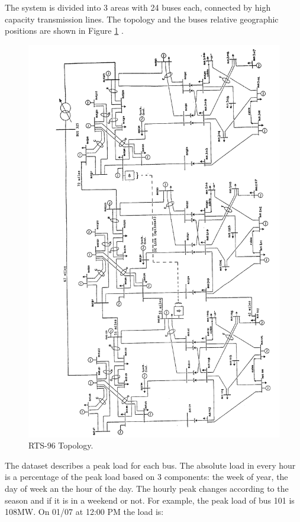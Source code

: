 \documentclass[12pt,LUDisStyle,twosided]{book}
\begin{document}
The system is divided into 3 areas with 24 buses each, connected by high capacity transmission lines. The topology and the buses relative geographic positions are shown in Figure \ref{fig:ieeetopology} \cite{wongieee}.

\begin{figure}[H]
\begin{center}
  \includegraphics[width=\textwidth,height=0.95\textheight,keepaspectratio]{ieeetopology.png}
  \caption{RTS-96 Topology.}
  \label{fig:ieeetopology}
\end{center}
\end{figure}

The dataset describes a peak load for each bus. The absolute load in every hour is a percentage of the peak load based on 3 components: the week of year, the day of week an the hour of the day. The hourly peak changes according to the season and if it is in a weekend or not. For example, the peak load of bus 101 is 108MW. On 01/07 at 12:00 PM the load is:
\end{document}

